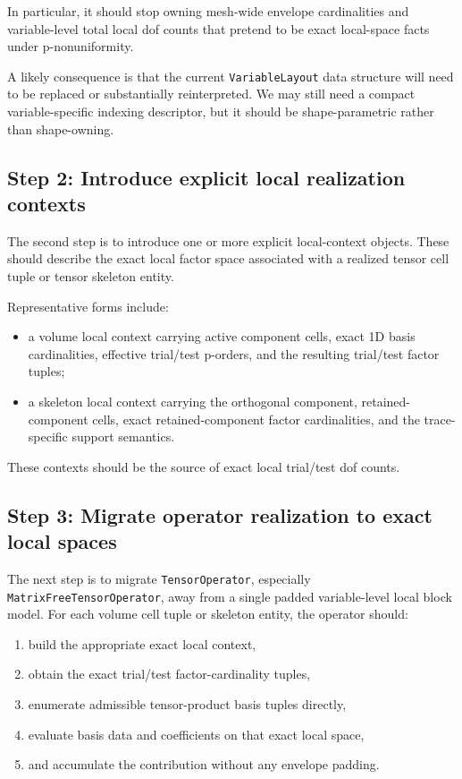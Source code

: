 \documentclass[11pt]{article}
\begin{document}
In particular, it should stop owning mesh-wide envelope cardinalities and variable-level total local dof counts that pretend to be exact local-space facts under p-nonuniformity.

A likely consequence is that the current \texttt{VariableLayout} data structure will need to be replaced or substantially reinterpreted.  We may still need a compact variable-specific indexing descriptor, but it should be shape-parametric rather than shape-owning.

\subsection{Step 2: Introduce explicit local realization contexts}

The second step is to introduce one or more explicit local-context objects.  These should describe the exact local factor space associated with a realized tensor cell tuple or tensor skeleton entity.

Representative forms include:

\begin{itemize}[leftmargin=2em]
\item a volume local context carrying active component cells, exact 1D basis cardinalities, effective trial/test p-orders, and the resulting trial/test factor tuples;
\item a skeleton local context carrying the orthogonal component, retained-component cells, exact retained-component factor cardinalities, and the trace-specific support semantics.
\end{itemize}

These contexts should be the source of exact local trial/test dof counts.

\subsection{Step 3: Migrate operator realization to exact local spaces}

The next step is to migrate \texttt{TensorOperator}, especially \texttt{MatrixFreeTensorOperator}, away from a single padded variable-level local block model.  For each volume cell tuple or skeleton entity, the operator should:

\begin{enumerate}[leftmargin=2em]
\item build the appropriate exact local context,
\item obtain the exact trial/test factor-cardinality tuples,
\item enumerate admissible tensor-product basis tuples directly,
\item evaluate basis data and coefficients on that exact local space,
\item and accumulate the contribution without any envelope padding.
\end{enumerate}
\end{document}
